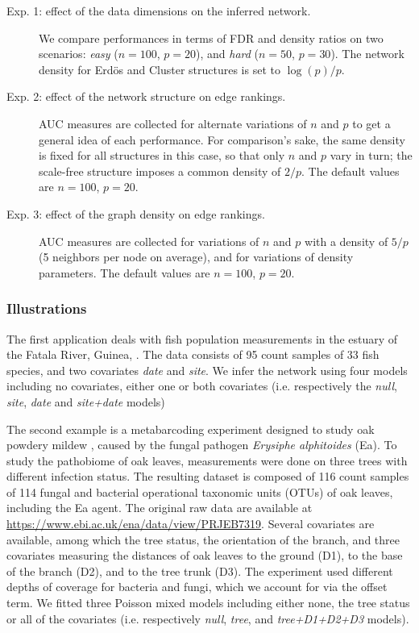 \begin{description}
\item[Exp. 1: effect of the data dimensions on the inferred network.] We compare performances in terms of FDR and density ratios on two scenarios: \textit{easy} ($n=100$, $p=20$), and \textit{hard} ($n=50$, $p=30$). The network density for Erdös and Cluster structures is set to $\log(p)/p$.
\item[Exp. 2: effect of the network structure on edge rankings.] AUC measures are collected for alternate variations of $n$ and $p$ to get a general idea of each performance. For comparison's sake, the same density is fixed for all structures in this case,  so that only $n$ and $p$ vary in turn; the scale-free structure imposes a common density of $2/p$. The default values are $n=100$, $p=20$. 
\item[Exp. 3:  effect of the graph density on edge rankings.] AUC measures are collected for variations of $n$ and $p$ with a density of $5/p$ (5 neighbors per node on average), and for variations of density parameters. The default values are $n=100$, $p=20$.
\end{description}


 \subsubsection{Illustrations} \label{sec:datasets}
 
The first application deals with fish population measurements in the estuary of the Fatala River, Guinea, \citep[][available in the R package \textit{ade4}]{baran1995dynamique}. The data consists of 95 count samples of 33 fish species, and two covariates {\it date} and {\it site}. 
We infer the network using four models including no covariates, either one  or both covariates (i.e. respectively the \textit{null}, \textit{site}, \textit{date} and \textit{site+date} models)

The second example is a metabarcoding experiment designed to study oak powdery mildew \citep{jakuch}, caused by the fungal pathogen \textit{Erysiphe alphitoides} (Ea). To study the pathobiome of oak leaves, measurements were done on three trees with different infection status. The resulting dataset is composed of 116 count samples of 114 fungal and bacterial  operational taxonomic units (OTUs) of oak leaves, including the Ea agent.  The original raw data are available at \url{https://www.ebi.ac.uk/ena/data/view/PRJEB7319}. Several covariates are available, among which the tree status, the orientation of the branch, and three covariates measuring the distances of oak leaves to the ground (D1), to the base of the branch (D2), and to the tree trunk (D3). The experiment used different depths of coverage for bacteria and fungi, which we account for via the offset term. We fitted three Poisson mixed models including either none, the tree status or all of the covariates (i.e. respectively \textit{null}, \textit{tree}, and \textit{tree+D1+D2+D3} models).

